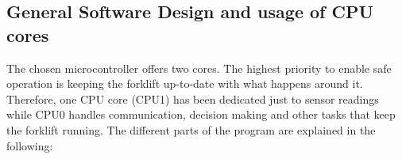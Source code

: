 \documentclass[../report.tex]{subfiles}
\begin{document}
\subsection{General Software Design and usage of CPU cores}
The chosen microcontroller offers two cores. The highest priority to enable
safe operation is keeping the forklift up-to-date with what happens around it.
Therefore, one CPU core (CPU1) has been dedicated just to sensor readings while CPU0 handles
communication, decision making and other tasks that keep the forklift running. 
The different parts of the program are explained in the following:
\end{document}
